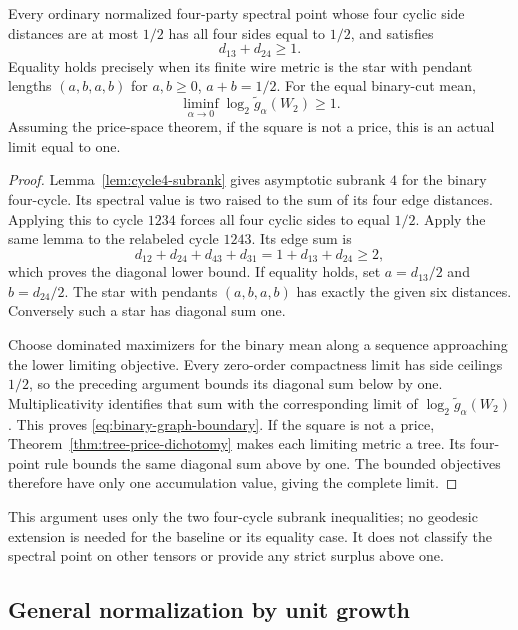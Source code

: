 \begin{corollary}
\label{cor:binary-graph-face}
Every ordinary normalized four-party spectral point whose four cyclic
side distances are at most $1/2$ has all four sides equal to $1/2$,
and satisfies
\[
 d_{13}+d_{24}\geq1.
\]
Equality holds precisely when its finite wire metric is the star with
pendant lengths $(a,b,a,b)$ for $a,b\geq0$, $a+b=1/2$.
For the equal binary-cut mean,
\begin{equation}\label{eq:binary-graph-boundary}
 \liminf_{\alpha\to0}\log_2\widetilde g_\alpha(W_2)\geq1.
\end{equation}
Assuming the price-space theorem, if the square is not a price,
this is an actual limit equal to one.
\end{corollary}
\begin{proof}
Lemma~\ref{lem:cycle4-subrank} gives asymptotic subrank $4$ for the
binary four-cycle. Its spectral value is two raised to the sum of
its four edge distances. Applying this to cycle $1234$ forces all
four cyclic sides to equal $1/2$. Apply the same lemma to the
relabeled cycle $1243$. Its edge sum is
\[
 d_{12}+d_{24}+d_{43}+d_{31}=1+d_{13}+d_{24}\geq2,
\]
which proves the diagonal lower bound.
If equality holds, set $a=d_{13}/2$ and $b=d_{24}/2$.
The star with pendants $(a,b,a,b)$ has exactly the given six distances.
Conversely such a star has diagonal sum one.

Choose dominated maximizers for the binary mean along a sequence
approaching the lower limiting objective. Every zero-order compactness
limit has side ceilings $1/2$, so the preceding argument bounds its
diagonal sum below by one. Multiplicativity identifies that sum with
the corresponding limit of $\log_2\widetilde g_\alpha(W_2)$.
This proves \eqref{eq:binary-graph-boundary}.
If the square is not a price, Theorem~\ref{thm:tree-price-dichotomy}
makes each limiting metric a tree. Its four-point rule bounds the
same diagonal sum above by one. The bounded objectives therefore
have only one accumulation value, giving the complete limit.
\end{proof}

This argument uses only the two four-cycle subrank inequalities;
no geodesic extension is needed for the baseline or its equality case.
It does not classify the spectral point on other tensors or provide
any strict surplus above one.

\subsection{General normalization by unit growth}


